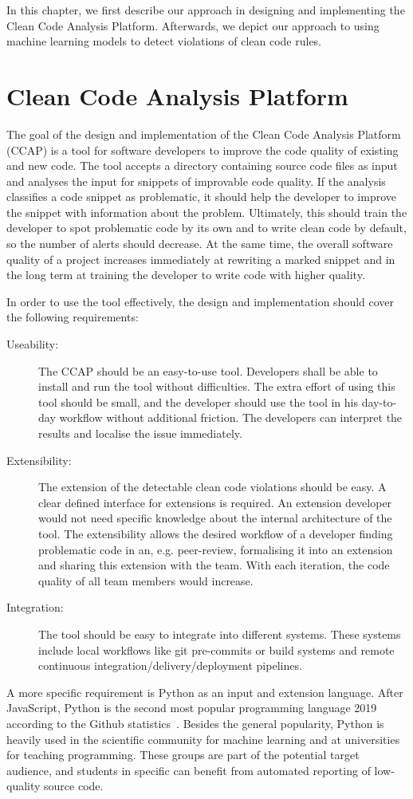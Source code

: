 In this chapter, we first describe our approach in designing and implementing the Clean Code Analysis Platform. Afterwards, we depict our approach to using machine learning models to detect violations of clean code rules.

\section{Clean Code Analysis Platform}
The goal of the design and implementation of the Clean Code Analysis Platform (CCAP) is a tool for software developers to improve the code quality of existing and new code. The tool accepts a directory containing source code files as input and analyses the input for snippets of improvable code quality. If the analysis classifies a code snippet as problematic, it should help the developer to improve the snippet with information about the problem. Ultimately, this should train the developer to spot problematic code by its own and to write clean code by default, so the number of alerts should decrease. At the same time, the overall software quality of a project increases immediately at rewriting a marked snippet and in the long term at training the developer to write code with higher quality.

In order to use the tool effectively, the design and implementation should cover the following requirements:
\begin{description}
    \item[Useability:]  The CCAP should be an easy-to-use tool. Developers shall be able to install and run the tool without difficulties. The extra effort of using this tool should be small, and the developer should use the tool in his day-to-day workflow without additional friction. The developers can interpret the results and localise the issue immediately.
    \item[Extensibility:] The extension of the detectable clean code violations should be easy. A clear defined interface for extensions is required. An extension developer would not need specific knowledge about the internal architecture of the tool. The extensibility allows the desired workflow of a developer finding problematic code in an, e.g. peer-review, formalising it into an extension and sharing this extension with the team. With each iteration, the code quality of all team members would increase.
    \item[Integration:] The tool should be easy to integrate into different systems. These systems include local workflows like git pre-commits or build systems and remote continuous integration/delivery/deployment pipelines.
\end{description}
A more specific requirement is Python as an input and extension language. After JavaScript, Python is the second most popular programming language 2019 according to the Github statistics~\cite{github_inc_state_2019}. Besides the general popularity, Python is heavily used in the scientific community for machine learning and at universities for teaching programming. These groups are part of the potential target audience, and students in specific can benefit from automated reporting of low-quality source code.

